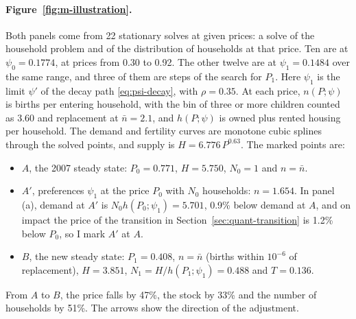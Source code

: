 \paragraph{Figure~\ref{fig:m-illustration}.} Both panels come from 22
stationary solves at given prices: a solve of the household problem and of
the distribution of households at that price. Ten are at $\psi_0=0.1774$, at
prices from 0.30 to 0.92. The other twelve are at $\psi_1=0.1484$ over the
same range, and three of them are steps of the search for $P_1$. Here $\psi_1$
is the limit $\psi'$ of the decay path \eqref{eq:psi-decay}, with $\rho=0.35$.
At each price, $n(P;\psi)$ is births per entering household, with the bin of
three or more children counted as 3.60 and replacement at $\bar n=2.1$, and
$h(P;\psi)$ is owned plus rented housing per household. The demand and
fertility curves are monotone cubic splines through the solved points, and
supply is $H=6.776\,P^{0.63}$. The marked points are:
\begin{itemize}
 \item $A$, the 2007 steady state: $P_0=0.771$, $H=5.750$, $N_0=1$ and
 $n=\bar n$.
 \item $A'$, preferences $\psi_1$ at the price $P_0$ with $N_0$ households:
 $n=1.654$. In panel (a), demand at $A'$ is $N_0h(P_0;\psi_1)=5.701$, 0.9\%
 below demand at $A$, and on impact the price of the transition in
 Section~\ref{sec:quant-transition} is 1.2\% below $P_0$, so I mark $A'$ at
 $A$.
 \item $B$, the new steady state: $P_1=0.408$, $n=\bar n$ (births within
 $10^{-6}$ of replacement), $H=3.851$, $N_1=H/h(P_1;\psi_1)=0.488$ and
 $T=0.136$.
\end{itemize}
From $A$ to $B$, the price falls by 47\%, the stock by 33\% and the number of
households by 51\%. The arrows show the direction of the adjustment.
